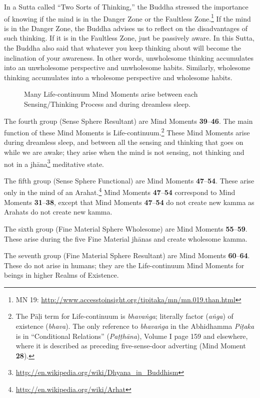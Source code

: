 In a Sutta called “Two Sorts of Thinking,” the Buddha stressed the importance of knowing if the mind is in the Danger Zone or the Faultless Zone.\footnote{MN 19: \url{http://www.accesstoinsight.org/tipitaka/mn/mn.019.than.html}} If the mind is in the Danger Zone, the Buddha advises us to reflect on the disadvantages of such thinking. If it is in the Faultless Zone, just be passively aware. In this Sutta, the Buddha also said that whatever you keep thinking about will become the inclination of your awareness. In other words, unwholesome thinking accumulates into an unwholesome perspective and unwholesome habits. Similarly, wholesome thinking accumulates into a wholesome perspective and wholesome habits.

\begin{figure}[h]
\centering

\caption{Many Life-continuum Mind Moments arise between each Sensing/Thinking Process and during dreamless sleep.}
\label{fig:Life_Cont}
\end{figure}

The fourth group (Sense Sphere Resultant) are Mind Moments \textbf{39}--\textbf{46}. The main function of these Mind Moments is Life-continuum.\footnote{The Pāḷi term for Life-continuum is \textit{bhavaṅga}; literally factor (\textit{aṅga}) of existence (\textit{bhava}). The only reference to \textit{bhavaṅga} in the Abhidhamma \textit{Piṭaka} is in “Conditional Relations” (\textit{Paṭṭhāna}), Volume I page 159 and elsewhere, where it is described as preceding five-sense-door adverting (Mind Moment \textbf{28}).} These Mind Moments arise during dreamless sleep, and between all the sensing and thinking that goes on while we are awake; they arise when the mind is not sensing, not thinking and not in a jhāna\footnote{\url{http://en.wikipedia.org/wiki/Dhyana_in_Buddhism}} meditative state.

The fifth group (Sense Sphere Functional) are Mind Moments \textbf{47}--\textbf{54}. These arise only in the mind of an Arahat.\footnote{\url{http://en.wikipedia.org/wiki/Arhat}} Mind Moments \textbf{47}--\textbf{54} correspond to Mind Moments \textbf{31}--\textbf{38}, except that Mind Moments \textbf{47}--\textbf{54} do not create new kamma as Arahats do not create new kamma.

The sixth group (Fine Material Sphere Wholesome) are Mind Moments \textbf{55}--\textbf{59}. These arise during the five Fine Material jhānas and create wholesome kamma.

The seventh group (Fine Material Sphere Resultant) are Mind Moments \textbf{60}--\textbf{64}. These do not arise in humans; they are the Life-continuum Mind Moments for beings in higher Realms of Existence.

